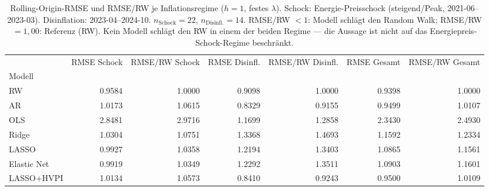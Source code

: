 \begin{table}
\caption{Rolling-Origin-RMSE und RMSE/RW je Inflationsregime ($h=1$, festes $\lambda$). Schock: Energie-Preisschock (steigend/Peak, 2021-06--2023-03). Disinflation: 2023-04--2024-10. $n_{\text{Schock}}=22$, $n_{\text{Disinfl.}}=14$. RMSE/RW $< 1$: Modell schlägt den Random Walk; RMSE/RW $= 1{,}00$: Referenz (RW). Kein Modell schlägt den RW in einem der beiden Regime — die Aussage ist nicht auf das Energiepreis-Schock-Regime beschränkt.}
\label{tab:regime}
\begin{tabular}{lrrrrrr}
\toprule
 & RMSE Schock & RMSE/RW Schock & RMSE Disinfl. & RMSE/RW Disinfl. & RMSE Gesamt & RMSE/RW Gesamt \\
Modell &  &  &  &  &  &  \\
\midrule
RW & 0.9584 & 1.0000 & 0.9098 & 1.0000 & 0.9398 & 1.0000 \\
AR & 1.0173 & 1.0615 & 0.8329 & 0.9155 & 0.9499 & 1.0107 \\
OLS & 2.8481 & 2.9716 & 1.1699 & 1.2858 & 2.3430 & 2.4930 \\
Ridge & 1.0304 & 1.0751 & 1.3368 & 1.4693 & 1.1592 & 1.2334 \\
LASSO & 0.9927 & 1.0358 & 1.2194 & 1.3403 & 1.0865 & 1.1561 \\
Elastic Net & 0.9919 & 1.0349 & 1.2292 & 1.3511 & 1.0903 & 1.1601 \\
LASSO+HVPI & 1.0134 & 1.0573 & 0.8410 & 0.9243 & 0.9500 & 1.0109 \\
\bottomrule
\end{tabular}
\end{table}
